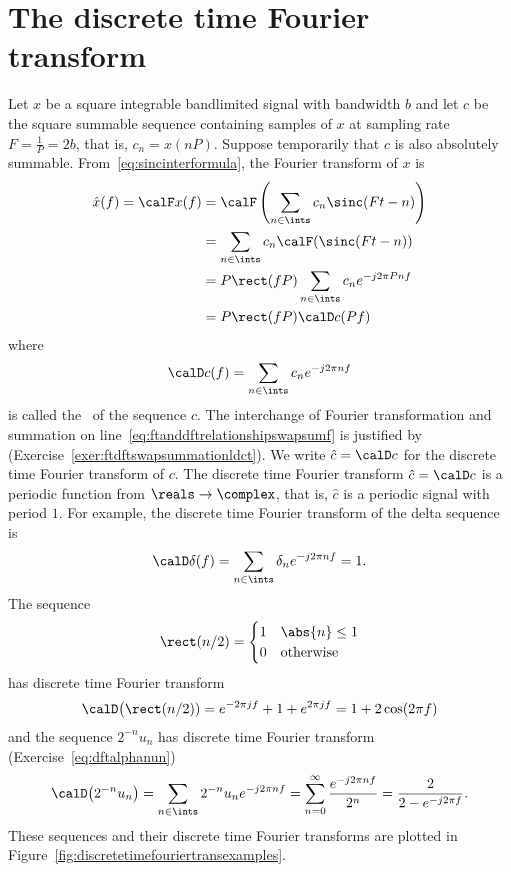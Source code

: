 \section{The discrete time Fourier transform}

Let $x$ be a square integrable bandlimited signal with bandwidth $b$ and let $c$ be the square summable sequence containing samples of $x$ at sampling rate $F = \tfrac{1}{P} = 2b$, that is, $c_n = x(nP)$.  Suppose temporarily that $c$ is also absolutely summable.  
From~\eqref{eq:sincinterformula}, the Fourier transform of $x$ is 
\begin{align}
\hat{x}(f) = \calF x(f) &= \calF\left( \sum_{n \in \ints} c_n \sinc(F t - n)\right) \nonumber \\
&= \sum_{n \in \ints} c_n \calF(\sinc(F t - n))  \label{eq:ftanddftrelationshipswapsumf} \\
&= P \rect( f P ) \sum_{n \in \ints} c_n e^{-j 2\pi P n f } \nonumber \\
&= P \rect( f P ) \calD c(Pf) \qquad \label{eq:ftanddftrelationship}
\end{align}
where
\begin{equation}\label{eq:disctransintro}
\calD c(f) = \sum_{n \in \ints} c_n e^{-j 2\pi n f}
\end{equation}
is called the~ of the sequence $c$.  The interchange of Fourier transformation and summation on line~\eqref{eq:ftanddftrelationshipswapsumf} is justified by ~\cite[Section~1.34]{Rudin_real_and_complex_analysis} (Exercise~\ref{exer:ftdftswapsummationldct}).  We write $\hat{c} = \calD c$ for the discrete time Fourier transform of $c$.  The discrete time Fourier transform $\hat{c} = \calD c$ is a periodic function from $\reals \to \complex$, that is, $\hat{c}$ is a periodic signal with period $1$.  For example, the discrete time Fourier transform of the delta sequence is 
\[
\calD \delta(f) = \sum_{n \in \ints} \delta_n e^{-j 2\pi n f} = 1. 
\]
The sequence 
\[
\rect(n/2) = \begin{cases}
1 & \abs{n} \leq 1 \\
0 & \text{otherwise}
\end{cases}
\]
has discrete time Fourier transform
\[
\calD\big( \rect(n/2) ) = e^{-2\pi j  f} + 1 + e^{2\pi j f} = 1 + 2\cos(2\pi f)
\]
and the sequence $2^{-n} u_n$ has discrete time Fourier transform (Exercise~\ref{eq:dftalphanun})
\begin{align*}
\calD\big( 2^{-n} u_n \big) =  \sum_{n \in \ints} 2^{-n} u_n e^{-j 2\pi n f} = \sum_{n = 0}^\infty \frac{e^{-j 2\pi n f}}{2^n} = \frac{2}{2 -  e^{-j 2\pi f}}.
\end{align*}
These sequences and their discrete time Fourier transforms are plotted in Figure~\ref{fig:discretetimefouriertransexamples}.  

